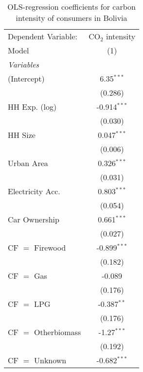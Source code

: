 
\begin{table}[htbp!]
   \centering
   \small
   \begin{adjustbox}{width = 1\textwidth, max height = 0.95\textheight, center}
      \begin{threeparttable}[b]
         \caption{\label{tab:OLS_1_BOL} OLS-regression coefficients for carbon intensity of consumers in Bolivia}
         \begin{tabular}{lc}
            \tabularnewline \midrule \midrule
            Dependent Variable: & CO$_{2}$ intensity\\  
            Model               & (1)\\  
            \midrule
            \emph{Variables}\\
            (Intercept)         & 6.35$^{***}$\\   
                                & (0.286)\\   
            HH Exp. (log)       & -0.914$^{***}$\\   
                                & (0.030)\\   
            HH Size             & 0.047$^{***}$\\   
                                & (0.006)\\   
            Urban Area          & 0.326$^{***}$\\   
                                & (0.031)\\   
            Electricity Acc.    & 0.803$^{***}$\\   
                                & (0.054)\\   
            Car Ownership       & 0.661$^{***}$\\   
                                & (0.027)\\   
            CF $=$ Firewood     & -0.899$^{***}$\\   
                                & (0.182)\\   
            CF $=$ Gas          & -0.089\\   
                                & (0.176)\\   
            CF $=$ LPG          & -0.387$^{**}$\\   
                                & (0.176)\\   
            CF $=$ Otherbiomass & -1.27$^{***}$\\   
                                & (0.192)\\   
            CF $=$ Unknown      & -0.682$^{***}$\\   

\end{tabular}
\end{threeparttable}
\end{adjustbox}
\end{table}
